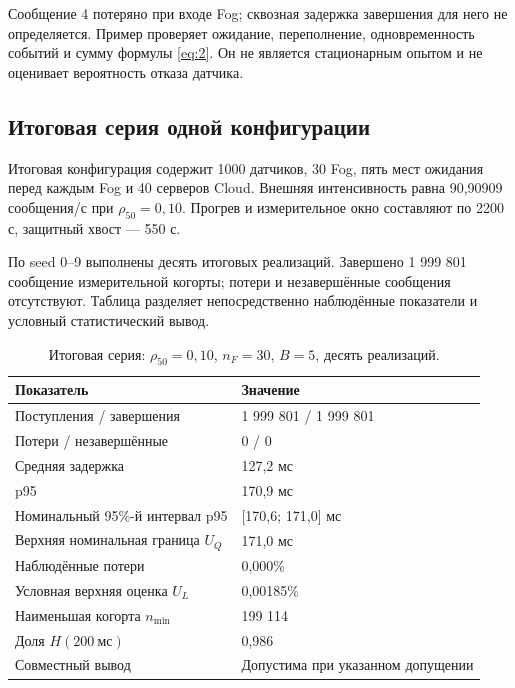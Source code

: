 Сообщение 4 потеряно при входе Fog; сквозная задержка завершения для него не определяется. Пример проверяет ожидание, переполнение, одновременность событий и сумму формулы \eqref{eq:2}. Он не является стационарным опытом и не оценивает вероятность отказа датчика.

\hypertarget{ux438ux442ux43eux433ux43eux432ux430ux44f-ux441ux435ux440ux438ux44f-ux43eux434ux43dux43eux439-ux43aux43eux43dux444ux438ux433ux443ux440ux430ux446ux438ux438}{%
\subsection{Итоговая серия одной конфигурации}}

Итоговая конфигурация содержит 1000 датчиков, 30 Fog, пять мест ожидания перед каждым Fog и 40 серверов Cloud. Внешняя интенсивность равна 90,90909 сообщения/с при \(\rho_{50}=0{,}10\). Прогрев и измерительное окно составляют по 2200 с, защитный хвост --- 550 с.

По seed 0--9 выполнены десять итоговых реализаций. Завершено 1 999 801 сообщение измерительной когорты; потери и незавершённые сообщения отсутствуют. Таблица \hyperlink{fefc-tab:3}{} разделяет непосредственно наблюдённые показатели и условный статистический вывод.

{\small\setlength{\tabcolsep}{3pt}
\setlength{\LTcapwidth}{\linewidth}
\begin{longtable}[]{@{}ll@{}}
\caption{\hypertarget{fefc-tab:3}{}Итоговая серия: \(\rho_{50}=0{,}10\), \(n_F=30\), \(B=5\), десять реализаций.}\label{tab:3}\\
\toprule\noalign{}
Показатель & Значение \\
\midrule\noalign{}
\endhead
\bottomrule\noalign{}
\endlastfoot
Поступления / завершения & 1 999 801 / 1 999 801 \\
Потери / незавершённые & 0 / 0 \\
Средняя задержка & 127,2 мс \\
p95 & 170,9 мс \\
Номинальный 95\%-й интервал p95 & {[}170,6; 171,0{]} мс \\
Верхняя номинальная граница \(U_Q\) & 171,0 мс \\
Наблюдённые потери & 0,000\% \\
Условная верхняя оценка \(U_L\) & 0,00185\% \\
Наименьшая когорта \(n_{\min}\) & 199 114 \\
Доля \(H(200\ \text{мс})\) & 0,986 \\
Совместный вывод & Допустима при указанном допущении \\
\end{longtable}
}

